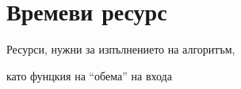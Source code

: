 \documentclass{beamer}
\begin{document}
\begin{frame}[fragile]
\begin{columns}[t]
\begin{column}{0.4\textwidth}
\begin{flushleft}
    \end{flushleft}
  \end{column}
\end{columns}



\end{frame}


\section{Времеви ресурс}


\begin{frame}
\centerline{Ресурси, нужни за изпълнението на алгоритъм,}
\centerline{като фунцкия на ``обема'' на входа}
\end{frame}
\end{document}

